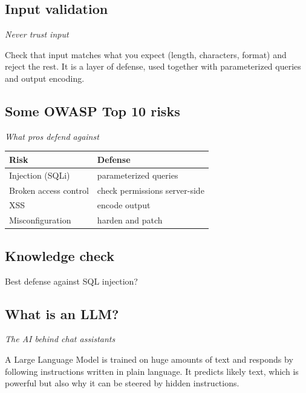 \documentclass[12pt,openany]{book}
\begin{document}
\medskip

\subsection*{Input validation}
{\small\itshape\color{gray}Never trust input}


Check that input matches what you expect (length, characters, format) and reject the rest. It is a layer of defense, used together with parameterized queries and output encoding.

\medskip

\subsection*{Some OWASP Top 10 risks}
{\small\itshape\color{gray}What pros defend against}


\begin{center}\small\begin{tabular}{p{6.5cm}p{6.5cm}}\toprule
\textbf{Risk} & \textbf{Defense} \\ \midrule
Injection (SQLi) & parameterized queries \\
Broken access control & check permissions server-side \\
XSS & encode output \\
Misconfiguration & harden and patch \\
\bottomrule\end{tabular}\end{center}

\medskip

\subsection*{Knowledge check}

Best defense against SQL injection?

\medskip

\subsection*{What is an LLM?}
{\small\itshape\color{gray}The AI behind chat assistants}


A Large Language Model is trained on huge amounts of text and responds by following instructions written in plain language. It predicts likely text, which is powerful but also why it can be steered by hidden instructions.

\medskip
\end{document}
